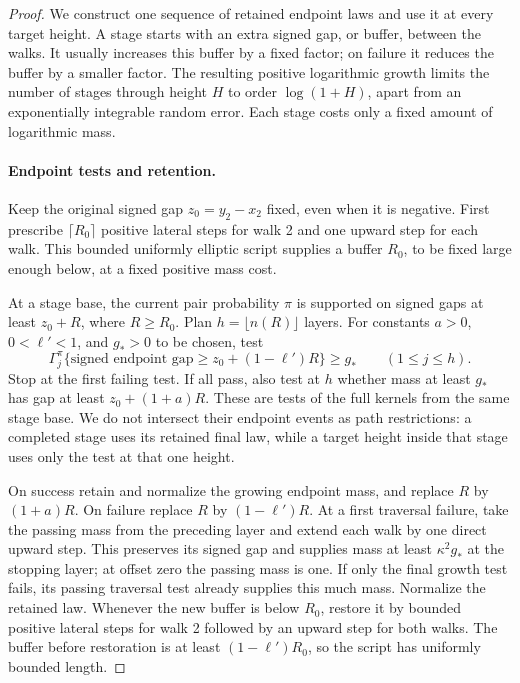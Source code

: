 \begin{proof}
We construct one sequence of retained endpoint laws and use it at every
target height. A stage starts with an extra signed gap, or buffer,
between the walks. It usually increases this buffer by a fixed factor;
on failure it reduces the buffer by a smaller factor. The resulting
positive logarithmic growth limits the number of stages through height
\(H\) to order \(\log(1+H)\), apart from an exponentially integrable
random error. Each stage costs only a fixed amount of logarithmic mass.

\paragraph{Endpoint tests and retention.}
Keep the original signed gap \(z_0=y_2-x_2\) fixed, even when it is
negative. First prescribe \(\lceil R_0\rceil\) positive lateral
steps for walk 2 and one upward step for each walk. This bounded
uniformly elliptic script supplies a buffer \(R_0\), to be fixed
large enough below, at a fixed positive mass cost.

At a stage base, the current pair probability \(\pi\) is supported
on signed gaps at least \(z_0+R\), where \(R\ge R_0\). Plan
\(h=\lfloor n(R)\rfloor\) layers. For constants
\(a>0\), \(0<\ell'<1\), and \(g_*>0\) to be chosen, test
\[
\Gamma_j^\pi\{\text{signed endpoint gap}\ge z_0+(1-\ell')R\}
   \ge g_*
\qquad(1\le j\le h).
\]
Stop at the first failing test. If all pass, also test at \(h\)
whether mass at least \(g_*\) has gap at least \(z_0+(1+a)R\).
These are tests of the full kernels from the same stage base. We do not
intersect their endpoint events as path restrictions: a completed stage
uses its retained final law, while a target height inside that stage
uses only the test at that one height.

On success retain and normalize the growing endpoint mass, and replace
\(R\) by \((1+a)R\). On failure replace \(R\) by
\((1-\ell')R\). At a first traversal failure, take the passing
mass from the preceding layer and extend each walk by one direct upward
step. This preserves its signed gap and supplies mass at least
\(\kappa^2g_*\) at the stopping layer; at offset zero the passing
mass is one. If only the final growth test fails, its passing traversal
test already supplies this much mass. Normalize the retained law.
Whenever the new buffer is below \(R_0\), restore it by bounded
positive lateral steps for walk 2 followed by an upward step for both
walks. The buffer before restoration is at least
\((1-\ell')R_0\), so the script has uniformly bounded length.


\end{proof}
